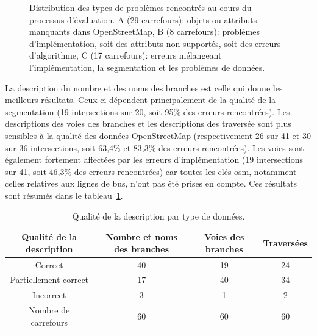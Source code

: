 \begin{figure}[ht]
    \centering
    \caption[Types de problèmes rencontrés au cours du processus d'évaluation]{Distribution des types de problèmes rencontrés au cours du processus d'évaluation. A (29 carrefours): objets ou attributs manquants dans OpenStreetMap, B (8 carrefours): problèmes d'implémentation, soit des attributs non supportés, soit des erreurs d'algorithme, C (17 carrefours): erreurs mélangeant l'implémentation, la segmentation et les problèmes de données.}
    \label{fig:camissues}
\end{figure}

\newpar{}

La description du nombre et des noms des branches est celle qui donne les meilleurs résultats. Ceux-ci dépendent principalement de la qualité de la segmentation (19 intersections sur 20, soit 95\% des erreurs rencontrées). Les descriptions des voies des branches et les descriptions des traversée sont plus sensibles à la qualité des données OpenStreetMap (respectivement 26 sur 41 et 30 sur 36 intersections, soit 63,4\% et 83,3\% des erreurs rencontrées). Les voies sont également fortement affectées par les erreurs d'implémentation (19 intersections sur 41, soit 46,3\% des erreurs rencontrées) car toutes les clés \gls{osm}, notamment celles relatives aux lignes de bus, n'ont pas été prises en compte.  Ces résultats sont résumés dans le tableau~\ref{tab:descqualitybydesctype}.

\begin{table}[ht]
    \begin{center}
        \footnotesize
        \begin{tabular}{ c | c | c | c }
            Qualité de la description & Nombre et noms des branches & Voies des branches & Traversées\\
            \hline
            Correct & 40  & 19 & 24 \\
            Partiellement correct & 17 & 40 & 34 \\
            Incorrect & 3 & 1 & 2 \\
            \hline
            Nombre de carrefours & 60 & 60 & 60
        \end{tabular}
        \caption[Qualité de la description par type de données]{Qualité de la description par type de données.}
        \label{tab:descqualitybydesctype}
    \end{center}
\end{table}

